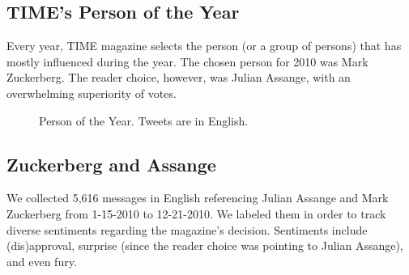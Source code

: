 \documentclass{sig-alternate}
\begin{document}
\subsection{TIME's Person of the Year}

Every year, TIME magazine selects the person (or a group of persons) that
has mostly influenced during the year. The chosen person for 2010 was Mark Zuckerberg. The reader choice, however, was Julian Assange, with an overwhelming superiority of votes.

\begin{figure}[htp!]
\centering
{}
\caption{Person of the Year. Tweets are in English.}
\label{fig:assange}
\end{figure}

\subsection*{Zuckerberg and Assange}
We collected 5,616 messages in English
referencing Julian Assange and Mark Zuckerberg from 1-15-2010 to 12-21-2010.
We labeled them in order to track diverse sentiments regarding the magazine's decision. Sentiments include (dis)approval, surprise (since the reader choice was pointing to Julian Assange),
and even fury.
\end{document}
